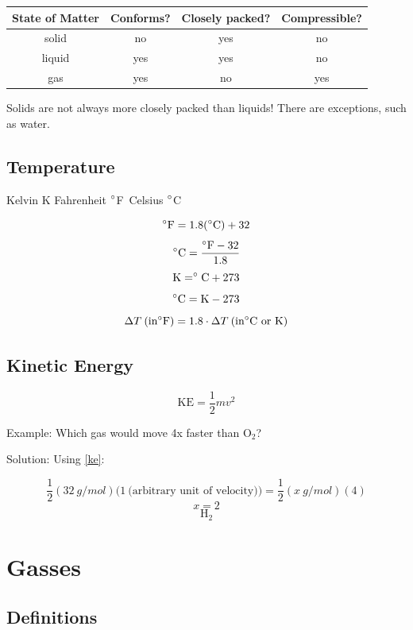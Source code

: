 \documentclass[a4paper, 12pt]{article}
\newcommand{\degC}{$\degree$C \,}
\newcommand{\degF}{$\degree$F \,}
\begin{document}
\begin{table}[H]

\begin{tabular}{c|c|c|c}
\textbf{State of Matter} & \textbf{Conforms?} & \textbf{Closely packed?} & \textbf{Compressible?} \\\hline
solid & no & yes & no \\
liquid & yes & yes & no \\
gas & yes & no & yes
\end{tabular}

\vspace{1em}
Solids are not always more closely packed than liquids! There are exceptions, such as water.

\end{table}

\subsection{Temperature}
Kelvin K Fahrenheit \degF Celsius \degC

$$\degree \text{F} = 1.8(\degree\text{C}) + 32$$
$$\degree \text{C} = \frac{\degree \text{F} -32}{1.8}$$
$$\text{K} = \degree\text{C} + 273$$
$$\degree\text{C} = \text{K} - 273$$
$$\Delta T \: (\text{in} \degree\text{F}) = 1.8 \cdot \Delta T \: (\text{in} \degree\text{C or K})$$

\subsection{Kinetic Energy}
\begin{equation}\label{ke}
    \text{KE} = \frac{1}{2}mv^2
\end{equation}

Example: Which gas would move 4x faster than O$_2$?

Solution: Using \ref{ke}:

$$\frac{1}{2}(32 \: g/mol)(1 \: \text{(arbitrary unit of velocity))} = \frac{1}{2}(x \: g/mol)(4)$$
$$x = 2$$
$$\boxed{\text{H}_2}$$

\section{Gasses}

\subsection{Definitions}
\end{document}
